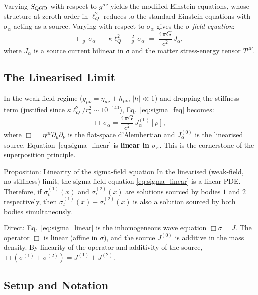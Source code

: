 \documentclass[11pt,a4paper]{article}
\theoremstyle{definition}
\theoremstyle{remark}
\newcommand{\sig}[2]{\sigma_{#1}^{(#2)}}
\newcommand{\lQ}{\ell_{Q}}
\begin{document}
	Varying $S_{\rm QGD}$ with respect to $g^{\mu\nu}$ yields the
	modified Einstein equations, whose structure at zeroth order in $\lQ^2$
	reduces to the standard Einstein equations with $\sigma_\alpha$ acting
	as a source.  Varying with respect to $\sigma_\alpha$ gives the
	\emph{$\sigma$-field equation}:
	\begin{equation}
		\Box_g\,\sigma_\alpha
		\;-\;
		\kappa\lQ^2\,\Box_g^2\,\sigma_\alpha
		\;=\;
		\frac{4\pi G}{c^2}\,J_\alpha,
		\label{eq:sigma_feq}
	\end{equation}
	where $J_\alpha$ is a source current bilinear in $\sigma$ and the
	matter stress-energy tensor $T^{\mu\nu}$.
	
	\subsection{The Linearised Limit}
	
	In the weak-field regime ($g_{\mu\nu}=\eta_{\mu\nu}+h_{\mu\nu}$,
	$|h|\ll1$) and dropping the stiffness term (justified since
	$\kappa\lQ^2/r_s^2\sim10^{-140}$), Eq.~\eqref{eq:sigma_feq} becomes:
	\begin{equation}
		\Box\,\sigma_\alpha = \frac{4\pi G}{c^2}\,J_\alpha^{(0)}[\rho],
		\label{eq:sigma_linear}
	\end{equation}
	where $\Box=\eta^{\mu\nu}\partial_\mu\partial_\nu$ is the flat-space
	d'Alembertian and $J_\alpha^{(0)}$ is the linearised source.
	Equation~\eqref{eq:sigma_linear} is \textbf{linear in $\sigma_\alpha$}.
	This is the cornerstone of the superposition principle.
	
	Proposition: Linearity of the sigma-field equation
		In the linearised (weak-field, no-stiffness) limit, the sigma-field
		equation \eqref{eq:sigma_linear} is a linear PDE.  Therefore, if
		$\sig{t}{1}(x)$ and $\sig{t}{2}(x)$ are solutions sourced by bodies
		$1$ and $2$ respectively, then $\sig{t}{1}(x)+\sig{t}{2}(x)$ is also
		a solution sourced by both bodies simultaneously.
	
		Direct: Eq.~\eqref{eq:sigma_linear} is the inhomogeneous wave equation
		$\Box\sigma=J$.  The operator $\Box$ is linear (affine in $\sigma$),
		and the source $J^{(0)}$ is additive in the mass density.  By
		linearity of the operator and additivity of the source,
		$\Box(\sigma^{(1)}+\sigma^{(2)})=J^{(1)}+J^{(2)}$.
	
	
	\subsection{Setup and Notation}
	
\end{document}
